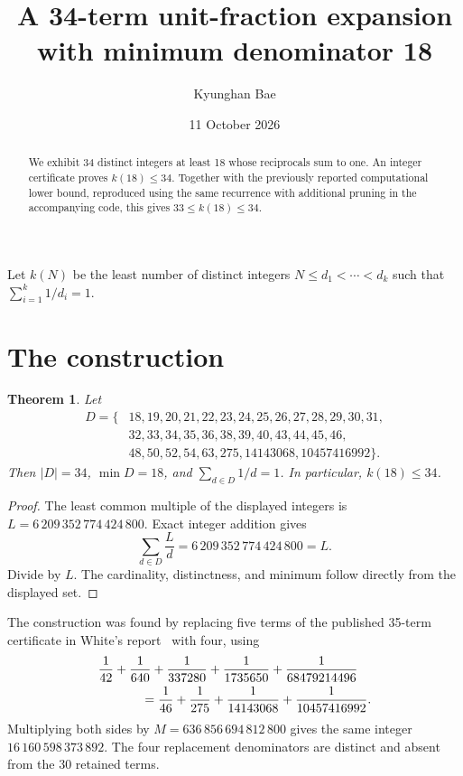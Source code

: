 \documentclass[11pt]{article}
\title{A 34-term unit-fraction expansion with minimum denominator 18}
\author{Kyunghan Bae}
\date{11 October 2026}
\newtheorem{theorem}{Theorem}
\begin{document}
\maketitle
\begin{abstract}
We exhibit 34 distinct integers at least 18 whose reciprocals sum to one.
An integer certificate proves $k(18)\le34$. Together with the previously
reported computational lower bound, reproduced using the same recurrence with
additional pruning in the accompanying code, this gives $33\le k(18)\le34$.
\end{abstract}

Let $k(N)$ be the least number of distinct integers
$N\le d_1<\cdots<d_k$ such that $\sum_{i=1}^k 1/d_i=1$.

\section{The construction}
\begin{theorem}
Let
\[
\begin{split}
D=\{&18,19,20,21,22,23,24,25,26,27,28,29,30,31,\\
&32,33,34,35,36,38,39,40,43,44,45,46,\\
&48,50,52,54,63,275,14143068,10457416992\}.
\end{split}
\]
Then $|D|=34$, $\min D=18$, and $\sum_{d\in D}1/d=1$.
In particular, $k(18)\le34$.
\end{theorem}
\begin{proof}
The least common multiple of the displayed integers is
$L=6\,209\,352\,774\,424\,800$.
Exact integer addition gives
\[
\sum_{d\in D}\frac{L}{d}=6\,209\,352\,774\,424\,800=L.
\]
Divide by $L$. The cardinality, distinctness, and minimum follow directly
from the displayed set.
\end{proof}

The construction was found by replacing five terms of the published
35-term certificate in
White's report~\cite{white} with four, using
\[
\begin{split}
&\frac1{42}+\frac1{640}+\frac1{337280}
 +\frac1{1735650}+\frac1{68479214496}\\
&\hspace{12mm}=\frac1{46}+\frac1{275}
 +\frac1{14143068}+\frac1{10457416992}.
\end{split}
\]
Multiplying both sides by $M=636\,856\,694\,812\,800$ gives the same
integer $16\,160\,598\,373\,892$. The four replacement denominators
are distinct and absent from the 30 retained terms.
\end{document}
